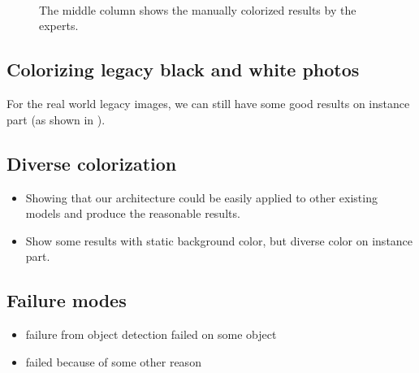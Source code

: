 {\begin{figure}[!b]
    \\
     \hfill
     \hfill
    \\
     \hfill
     \hfill
     \\
    \caption{ 
    The middle column shows the manually colorized results by the experts.}
    \label{fig:legacy}
\end{figure} 
\subsection{Colorizing legacy black and white photos}
\label{sec:legacy}
For the real world legacy images, we can still have some good results on instance part (as shown in ).


\subsection{Diverse colorization}
\label{sec:diverseColorization}
\begin{itemize}
    \item Showing that our architecture could be easily applied to other existing models and produce the reasonable results.
    \item Show some results with static background color, but diverse color on instance part.
\end{itemize}


\subsection{Failure modes}
\label{sec:failure}
\begin{itemize}
    \item failure from object detection failed on some object
    \item failed because of some other reason
\end{itemize}
}



